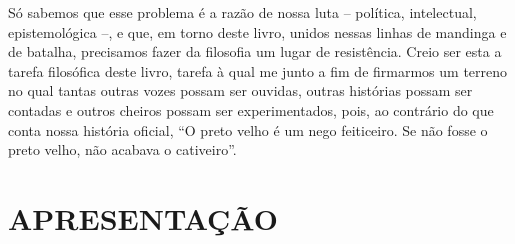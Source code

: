 Só sabemos que esse problema é a razão de nossa luta -- política,
intelectual, epistemológica --, e que, em torno deste livro, unidos
nessas linhas de mandinga e de batalha, precisamos fazer da filosofia um
lugar de resistência. Creio ser esta a tarefa filosófica deste livro,
tarefa à qual me junto a fim de firmarmos um terreno no qual tantas
outras vozes possam ser ouvidas, outras histórias possam ser contadas e
outros cheiros possam ser experimentados, pois, ao contrário do que
conta nossa história oficial, ``O preto velho é um nego feiticeiro. Se
não fosse o preto velho, não acabava o cativeiro''.

\hypertarget{apresentauxe7uxe3o}{%
\section{APRESENTAÇÃO}\label{apresentauxe7uxe3o}}

